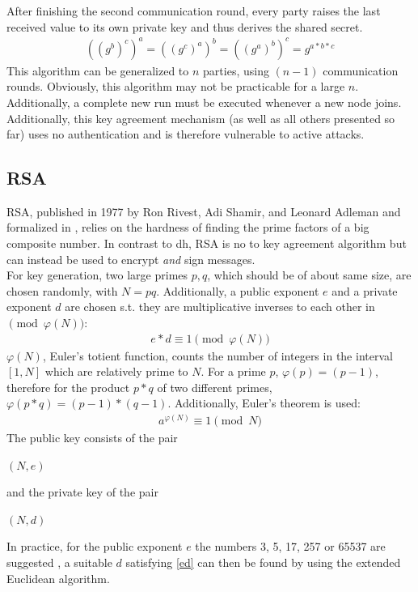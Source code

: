 After finishing the second communication round, every party raises the last received value to its own private key and thus derives the shared secret.
\begin{align}
 ((g^b)^c)^a = ((g^c)^a)^b = ((g^a)^b)^c = g^{a*b*c}
\end{align}
This algorithm can be generalized to $n$ parties, using $(n-1)$ communication rounds. Obviously, this algorithm may not be practicable for a large $n$. Additionally,
a complete new run must be executed whenever a new node joins.
\\
Additionally, this key agreement mechanism (as well as all others presented so far) uses no authentication and is therefore vulnerable to active attacks.

\subsection{RSA}

RSA, published in 1977 by Ron Rivest, Adi Shamir, and Leonard Adleman \cite{RSA} and formalized in \cite{pkcs1},
relies on the hardness of finding the prime factors of a big composite number.
In contrast to \gls{dh}, RSA is no to key agreement algorithm but can instead be used to encrypt \textit{and} sign messages. 
\\
For key generation, 
two large primes $p, q$, which should be of about same size, are chosen randomly, with $N = pq$. Additionally, a public exponent $e$ and a private exponent
$d$ are chosen s.t. they are multiplicative inverses to each other in $\pmod{\varphi(N)}$:
\begin{align}\label{ed}
 e * d \equiv 1 \pmod {\varphi(N)}
\end{align}
$\varphi(N)$, Euler's totient function, counts the number of integers in the interval $[1, N]$ which are relatively prime to $N$.
For a prime $p$, $\varphi(p) = (p-1)$, therefore for the product
$p*q$ of two different primes, $\varphi(p*q) = (p-1) * (q-1)$.
Additionally, Euler's theorem is used:
\begin{align}\label{euler}
a^{\varphi(N)} \equiv 1 \pmod N
\end{align}
The public key consists of the pair
\begin{center}
 $(N, e)$
\end{center}
and the private key of the pair
\begin{center}
 $(N, d)$
\end{center}
In practice, for the public exponent $e$ the numbers 3, 5, 17, 257 or 65537 are suggested \cite{891000}, a suitable $d$ satisfying \ref{ed} can then be found
by using the extended Euclidean algorithm.

